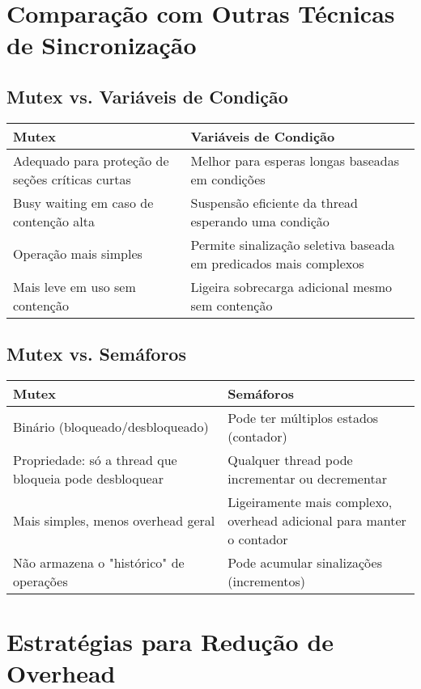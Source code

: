 \documentclass[12pt]{article}
\begin{document}
\section{Comparação com Outras Técnicas de Sincronização}

\subsection{Mutex vs. Variáveis de Condição}

\begin{tabulary}{\linewidth}{|L|L|}
\hline
\textbf{Mutex} & \textbf{Variáveis de Condição} \\
\hline
Adequado para proteção de seções críticas curtas & Melhor para esperas longas baseadas em condições \\
\hline
Busy waiting em caso de contenção alta & Suspensão eficiente da thread esperando uma condição \\
\hline
Operação mais simples & Permite sinalização seletiva baseada em predicados mais complexos \\
\hline
Mais leve em uso sem contenção & Ligeira sobrecarga adicional mesmo sem contenção \\
\hline
\end{tabulary}

\subsection{Mutex vs. Semáforos}

\begin{tabulary}{\linewidth}{|L|L|}
\hline
\textbf{Mutex} & \textbf{Semáforos} \\
\hline
Binário (bloqueado/desbloqueado) & Pode ter múltiplos estados (contador) \\
\hline
Propriedade: só a thread que bloqueia pode desbloquear & Qualquer thread pode incrementar ou decrementar \\
\hline
Mais simples, menos overhead geral & Ligeiramente mais complexo, overhead adicional para manter o contador \\
\hline
Não armazena o "histórico" de operações & Pode acumular sinalizações (incrementos) \\
\hline
\end{tabulary}

\section{Estratégias para Redução de Overhead}
\end{document}
